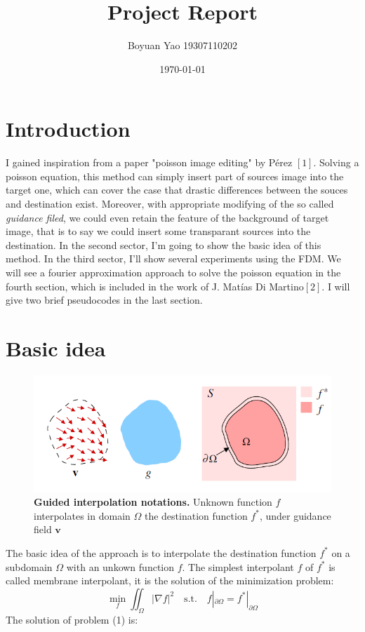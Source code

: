 \documentclass[11pt]{article}
\begin{document}
	
	\title{\bf Project Report}
	
	\author{Boyuan Yao 19307110202}
	
	
	\date{\today}
	\maketitle

\section{Introduction}
	I gained inspiration from a paper "poisson image editing" by P\'erez $\left[1\right]$. Solving a poisson equation, this method can simply insert part of sources image into the target one, which can cover the case that drastic differences between the souces and destination exist. Moreover, with appropriate modifying of the so called \textit{guidance filed}, we could even retain the feature of the background of target image, that is to say we could insert some transparant sources into the destination. In the second sector, I'm going to show the basic idea of this method. In the third sector, I'll show several experiments using the FDM. We will see a fourier approximation approach to solve the poisson equation in the fourth section, which is included in the work of J. Mat\'ias Di Martino$\left[2\right]$. I will give two brief pseudocodes in the last section.

\section{Basic idea}
	
	\begin{figure}[H]
		\centering
		\includegraphics[scale=0.9]{figure1.png}
		\caption{\textbf{Guided interpolation notations.} Unknown function $f$ interpolates in domain $\Omega$ the destination function $f^*$, under guidance field $\boldsymbol{v}$ \protect \footnotemark[1]}
	\end{figure}
	The basic idea of the approach is to interpolate the destination function $f^*$ on a subdomain $\Omega$ with an unkown function $f$. The simplest interpolant $f$ of $f^*$ is called membrane interpolant, it is the solution of the minimization problem:
	\begin{equation}
		\min\limits_f \iint_{\Omega}^{} |\nabla f|^2 \quad \text{s.t.} \quad f|_{\partial \Omega} = f^*|_{\partial \Omega}
	\end{equation}
	The solution of problem (1) is:
	
\end{document}
